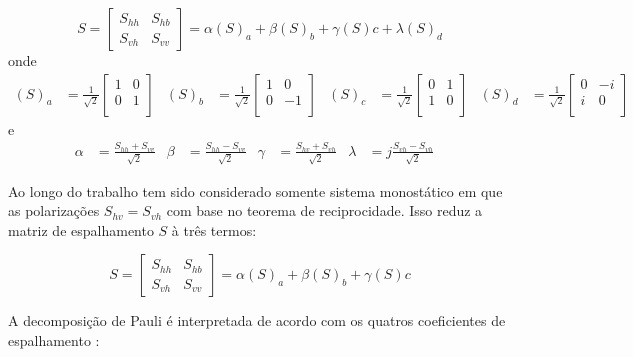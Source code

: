 \documentclass{article}
\begin{document}
\begin{equation}
    S = \begin{bmatrix}
        S_{hh} & S_{hb}\\
	    S_{vh} & S_{vv}
    \end{bmatrix} = \alpha(S)_{a}+\beta(S)_{b}+\gamma(S){c} + \lambda(S)_{d}
\end{equation}
onde
\begin{align}
    (S)_{a} &= \frac{1}{\sqrt{2}} \begin{bmatrix} 1 & 0 \\ 0 & 1\\ \end{bmatrix} &
    (S)_{b} &= \frac{1}{\sqrt{2}} \begin{bmatrix} 1 & 0 \\ 0 & -1\\ \end{bmatrix}&
    (S)_{c} &= \frac{1}{\sqrt{2}} \begin{bmatrix} 0 & 1 \\ 1 & 0\\ \end{bmatrix} &
    (S)_{d} &= \frac{1}{\sqrt{2}} \begin{bmatrix} 0 & -i \\ i & 0\\ \end{bmatrix}& 
\end{align}
e
\begin{align}
    \alpha &= \frac{S_{hh} + S_{vv}}{\sqrt{2}}&
    \beta &= \frac{S_{hh} - S_{vv}}{\sqrt{2}}&
    \gamma &= \frac{S_{hv} + S_{vh}}{\sqrt{2}}&
    \lambda &= j \frac{S_{vh} - S_{vh}}{\sqrt{2}}&
\end{align}

Ao longo do trabalho tem sido considerado somente sistema monostático em que as polarizações $S_{hv}=S_{vh}$ com base no teorema de reciprocidade. Isso reduz a matriz de espalhamento $S$ à três termos:

\begin{equation}
    S = \begin{bmatrix}
	S_{hh} & S_{hb}\\
	S_{vh} & S_{vv}
	\end{bmatrix} =\alpha(S)_{a}+\beta(S)_{b}+\gamma(S){c} 
\end{equation}

A decomposição de Pauli é interpretada de acordo com os quatros coeficientes de espalhamento \cite{jong:2009}: 
\end{document}
